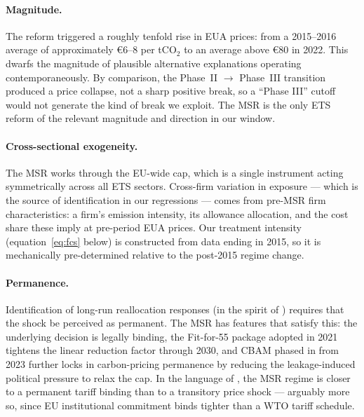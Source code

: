 \paragraph{Magnitude.} The reform triggered a roughly tenfold rise in EUA prices: from a 2015--2016 average of approximately €6--8 per tCO$_2$ to an average above €80 in 2022. This dwarfs the magnitude of plausible alternative explanations operating contemporaneously. By comparison, the Phase~II $\to$ Phase~III transition produced a price collapse, not a sharp positive break, so a ``Phase III'' cutoff would not generate the kind of break we exploit. The MSR is the only ETS reform of the relevant magnitude and direction in our window.

\paragraph{Cross-sectional exogeneity.} The MSR works through the EU-wide cap, which is a single instrument acting symmetrically across all ETS sectors. Cross-firm variation in exposure --- which is the source of identification in our regressions --- comes from pre-MSR firm characteristics: a firm's emission intensity, its allowance allocation, and the cost share these imply at pre-period EUA prices. Our treatment intensity (equation~\eqref{eq:fcs} below) is constructed from data ending in 2015, so it is mechanically pre-determined relative to the post-2015 regime change.

\paragraph{Permanence.} Identification of long-run reallocation responses (in the spirit of \citealp{peter2023}) requires that the shock be perceived as permanent. The MSR has features that satisfy this: the underlying decision is legally binding, the Fit-for-55 package adopted in 2021 tightens the linear reduction factor through 2030, and CBAM phased in from 2023 further locks in carbon-pricing permanence by reducing the leakage-induced political pressure to relax the cap. In the language of \citet{peter2023}, the MSR regime is closer to a permanent tariff binding than to a transitory price shock --- arguably more so, since EU institutional commitment binds tighter than a WTO tariff schedule.

